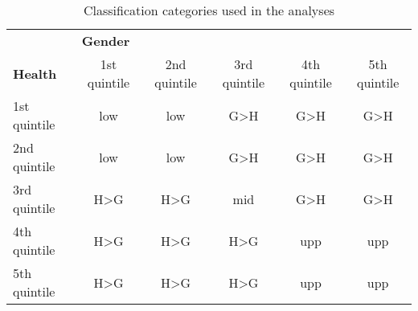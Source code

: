 \begin{table}[htb]
\centering
\caption{Classification categories used in the analyses}
\label{table_class}
\begin{tabular}{lccccc}
\toprule
                & \multicolumn{5}{l}{\textbf{Gender}} \\
\textbf{Health} & 1st quintile & 2nd quintile & 3rd quintile & 4th quintile & 5th quintile \\
\midrule
1st quintile    & low & low & G>H & G>H & G>H \\
2nd quintile    & low & low & G>H & G>H & G>H \\
3rd quintile    & H>G & H>G & mid & G>H & G>H \\
4th quintile    & H>G & H>G & H>G & upp & upp \\
5th quintile    & H>G & H>G & H>G & upp & upp \\
\bottomrule
\end{tabular}
\end{table}
